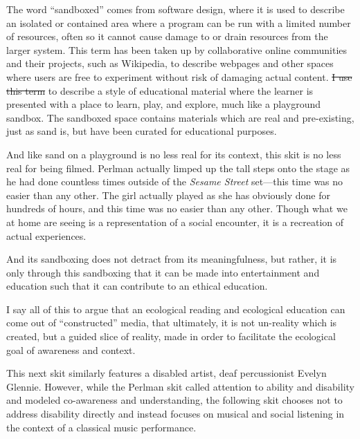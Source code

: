 \documentclass[12pt,letterpaper]{article}
\providecommand{\DIFadd}[1]{{\protect\color{blue}\uwave{#1}}} %
\providecommand{\DIFdel}[1]{{\protect\color{red}\sout{#1}}}                      %
\providecommand{\DIFaddbegin}{} %
\providecommand{\DIFaddend}{} %
\providecommand{\DIFdelbegin}{} %
\providecommand{\DIFdelend}{} %
\newcommand{\DIFscaledelfig}{0.5}
\newlength{\DIFdelgraphicswidth} %
\newlength{\DIFdelgraphicsheight} %
\newcommand{\DIFaddincludegraphics}[2][]{{\color{blue}\fbox{\DIFOincludegraphics[#1]{#2}}}} %
\newcommand{\DIFdelincludegraphics}[2][]{%
\sbox{\DIFdelgraphicsbox}{\DIFOincludegraphics[#1]{#2}}%
\settoboxwidth{\DIFdelgraphicswidth}{\DIFdelgraphicsbox} %
\settoboxtotalheight{\DIFdelgraphicsheight}{\DIFdelgraphicsbox} %
\scalebox{\DIFscaledelfig}{%
\parbox[b]{\DIFdelgraphicswidth}{\usebox{\DIFdelgraphicsbox}\\[-\baselineskip] \rule{\DIFdelgraphicswidth}{0em}}\llap{\resizebox{\DIFdelgraphicswidth}{\DIFdelgraphicsheight}{%
\setlength{\unitlength}{\DIFdelgraphicswidth}%
\begin{picture}(1,1)%
\thicklines\linethickness{2pt} %
{\color[rgb]{1,0,0}\put(0,0){\framebox(1,1){}}}%
{\color[rgb]{1,0,0}\put(0,0){\line( 1,1){1}}}%
{\color[rgb]{1,0,0}\put(0,1){\line(1,-1){1}}}%
\end{picture}%
}\hspace*{3pt}}} %
} %
\DeclareRobustCommand{\DIFaddbegin}{\DIFOaddbegin \let\includegraphics\DIFaddincludegraphics} %
\DeclareRobustCommand{\DIFaddend}{\DIFOaddend \let\includegraphics\DIFOincludegraphics} %
\DeclareRobustCommand{\DIFdelbegin}{\DIFOdelbegin \let\includegraphics\DIFdelincludegraphics} %
\DeclareRobustCommand{\DIFdelend}{\DIFOaddend \let\includegraphics\DIFOincludegraphics} %
\begin{document}
	The word ``sandboxed'' comes from software design, where it is used
	to describe an isolated or contained area where a program can be run 
	with a limited number of resources, often so it cannot cause damage to
	or drain resources from the larger system. This term has been taken up
	by collaborative online communities and their projects, such as 
	Wikipedia, to describe webpages and other spaces where users are free 
	to experiment without risk of damaging actual 
	content.\autocite{Wiktionary} \DIFdelbegin \DIFdel{I use this term }\DIFdelend \DIFaddbegin \DIFadd{The term is also used
	}\DIFaddend to describe a style of educational material where the learner is
	presented with a place to learn, play, and explore, much like a
	playground sandbox. The sandboxed space contains materials which are
	real and pre-existing, just as sand is, but have been curated for 
	educational purposes.

	And like sand on a playground is no less real for its context,
	this skit is no less real for being filmed. Perlman actually 
	limped up the tall steps onto the stage as he had done countless times 
	outside of the \textit{Sesame Street} set---this time was no easier than
	any other. The girl actually played as she has obviously done for
	hundreds of hours, and this time was no easier than any other. 
	Though what we at home are seeing is a representation of a social 
	encounter, it is a recreation of actual	experiences. 

	And its sandboxing does not detract from its meaningfulness, but rather,
	it is only through this sandboxing that it can be made into 
	entertainment and
	education such that it can contribute to an ethical education. 

	I say all of this to argue that an ecological reading and ecological 
	education 
	can come out of ``constructed'' media, that ultimately, it is not 
	un-reality which is created, but a guided slice of reality, made in 
	order to facilitate the ecological goal of awareness and context.  

	This next skit similarly features a disabled artist, deaf percussionist 
	Evelyn Glennie. However, while the Perlman skit called attention to
	ability and disability and modeled co-awareness and understanding, the
	following skit chooses not to address disability directly and instead 
	focuses on musical and social listening in the context of a classical 
	music performance. 
\end{document}
